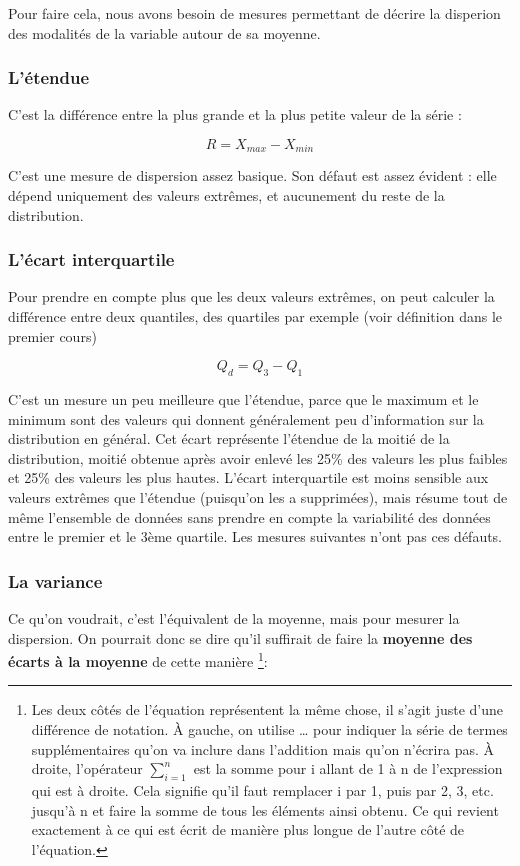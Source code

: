 \documentclass[
  french,
]{book}
\begin{document}
Pour faire cela, nous avons besoin de mesures permettant de décrire la disperion des modalités de la variable autour de sa moyenne.

\hypertarget{luxe9tendue}{%
\subsubsection{L'étendue}\label{luxe9tendue}}

C'est la différence entre la plus grande et la plus petite valeur de la série :

\[R = X_{max} - X_{min}\]

C'est une mesure de dispersion assez basique. Son défaut est assez évident : elle dépend uniquement des valeurs extrêmes, et aucunement du reste de la distribution.

\hypertarget{luxe9cart-interquartile}{%
\subsubsection{L'écart interquartile}\label{luxe9cart-interquartile}}

Pour prendre en compte plus que les deux valeurs extrêmes, on peut calculer la différence entre deux quantiles, des quartiles par exemple (voir définition dans le premier cours)

\[ Q_d = Q_3 - Q_1 \]

C'est un mesure un peu meilleure que l'étendue, parce que le maximum et le minimum sont des valeurs qui donnent généralement peu d'information sur la distribution en général. Cet écart représente l'étendue de la moitié de la distribution, moitié obtenue après avoir enlevé les 25\% des valeurs les plus faibles et 25\% des valeurs les plus hautes. L'écart interquartile est moins sensible aux valeurs extrêmes que l'étendue (puisqu'on les a supprimées), mais résume tout de même l'ensemble de données sans prendre en compte la variabilité des données entre le premier et le 3ème quartile. Les mesures suivantes n'ont pas ces défauts.

\hypertarget{la-variance}{%
\subsubsection{La variance}\label{la-variance}}

Ce qu'on voudrait, c'est l'équivalent de la moyenne, mais pour mesurer la dispersion. On pourrait donc se dire qu'il suffirait de faire la \textbf{moyenne des écarts à la moyenne} de cette manière \footnote{Les deux côtés de l'équation représentent la même chose, il s'agit juste d'une différence de notation. À gauche, on utilise \ldots{} pour indiquer la série de termes supplémentaires qu'on va inclure dans l'addition mais qu'on n'écrira pas. À droite, l'opérateur \(\sum_{i = 1}^{n}\) est la somme pour i allant de 1 à n de l'expression qui est à droite. Cela signifie qu'il faut remplacer i par 1, puis par 2, 3, etc. jusqu'à n et faire la somme de tous les éléments ainsi obtenu. Ce qui revient exactement à ce qui est écrit de manière plus longue de l'autre côté de l'équation.}:
\end{document}

